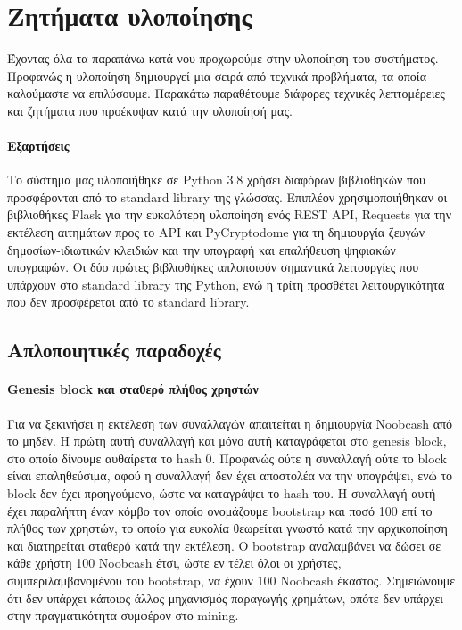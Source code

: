 \documentclass[titlepage]{article}
\begin{document}
\section{Ζητήματα υλοποίησης}

Έχοντας όλα τα παραπάνω κατά νου προχωρούμε στην υλοποίηση του συστήματος. Προφανώς η υλοποίηση δημιουργεί μια σειρά από τεχνικά προβλήματα, τα οποία καλούμαστε να επιλύσουμε. Παρακάτω παραθέτουμε διάφορες τεχνικές λεπτομέρειες και ζητήματα που προέκυψαν κατά την υλοποίησή μας.

\paragraph{Εξαρτήσεις}

Το σύστημα μας υλοποιήθηκε σε Python 3.8 χρήσει διαφόρων βιβλιοθηκών που προσφέρονται από το standard library της γλώσσας. Επιπλέον χρησιμοποιήθηκαν οι βιβλιοθήκες Flask για την ευκολότερη υλοποίηση ενός REST API, Requests για την εκτέλεση αιτημάτων προς το API και PyCryptodome για τη δημιουργία ζευγών δημοσίων-ιδιωτικών κλειδιών και την υπογραφή και επαλήθευση ψηφιακών υπογραφών. Οι δύο πρώτες βιβλιοθήκες απλοποιούν σημαντικά λειτουργίες που υπάρχουν στο standard library της Python, ενώ η τρίτη προσθέτει λειτουργικότητα που δεν προσφέρεται από το standard library.

\subsection{Απλοποιητικές παραδοχές}

\paragraph{Genesis block και σταθερό πλήθος χρηστών}

Για να ξεκινήσει η εκτέλεση των συναλλαγών απαιτείται η δημιουργία Noobcash από το μηδέν. Η πρώτη αυτή συναλλαγή και μόνο αυτή καταγράφεται στο genesis block, στο οποίο δίνουμε αυθαίρετα το hash 0. Προφανώς ούτε η συναλλαγή ούτε το block είναι επαληθεύσιμα, αφού η συναλλαγή δεν έχει αποστολέα να την υπογράψει, ενώ το block δεν έχει προηγούμενο, ώστε να καταγράψει το hash του. Η συναλλαγή αυτή έχει παραλήπτη έναν κόμβο τον οποίο ονομάζουμε bootstrap και ποσό 100 επί το πλήθος των χρηστών, το οποίο για ευκολία θεωρείται γνωστό κατά την αρχικοποίηση και διατηρείται σταθερό κατά την εκτέλεση. Ο bootstrap αναλαμβάνει να δώσει σε κάθε χρήστη 100 Noobcash έτσι, ώστε εν τέλει όλοι οι χρήστες, συμπεριλαμβανομένου του bootstrap, να έχουν 100 Noobcash έκαστος. Σημειώνουμε ότι δεν υπάρχει κάποιος άλλος μηχανισμός παραγωγής χρημάτων, οπότε δεν υπάρχει στην πραγματικότητα συμφέρον στο mining.
\end{document}
